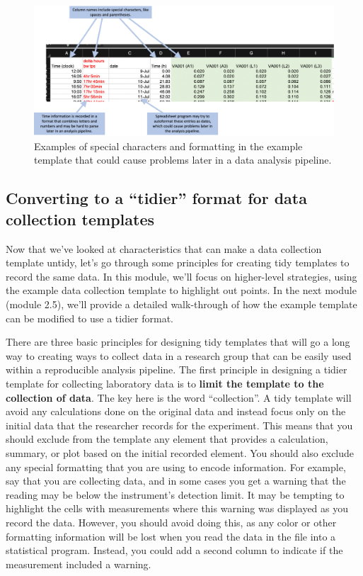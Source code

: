 \documentclass[]{tufte-book}
\begin{document}
\begin{figure}
\includegraphics[width=\textwidth]{figures/growth_curve_formatting} \caption[Examples of special characters and formatting in the example template that could cause problems later in a data analysis pipeline]{Examples of special characters and formatting in the example template that could cause problems later in a data analysis pipeline.}\label{fig:growthformatting}
\end{figure}

\subsection{Converting to a ``tidier'' format for data collection templates}\label{converting-to-a-tidier-format-for-data-collection-templates}

Now that we've looked at characteristics that can make a data collection
template untidy, let's go through some principles for creating tidy templates to
record the same data. In this module, we'll focus on higher-level strategies,
using the example data collection template to highlight out points. In the
next module (module 2.5), we'll provide a detailed walk-through of how the
example template can be modified to use a tidier format.

There are three basic principles for designing tidy templates that will go a
long way to creating ways to collect data in a research group that can be easily
used within a reproducible analysis pipeline. The first principle in designing a
tidier template for collecting laboratory data is to \textbf{limit the template to the
collection of data}. The key here is the word ``collection''. A tidy template
will avoid any calculations done on the original data and instead focus only on
the initial data that the researcher records for the experiment. This means that
you should exclude from the template any element that provides a calculation,
summary, or plot based on the initial recorded element. You should also exclude
any special formatting that you are using to encode information. For example,
say that you are collecting data, and in some cases you get a warning that the
reading may be below the instrument's detection limit. It may be tempting to
highlight the cells with measurements where this warning was displayed as you
record the data. However, you should avoid doing this, as any color or other
formatting information will be lost when you read the data in the file into a
statistical program. Instead, you could add a second column to indicate if the
measurement included a warning.
\end{document}

